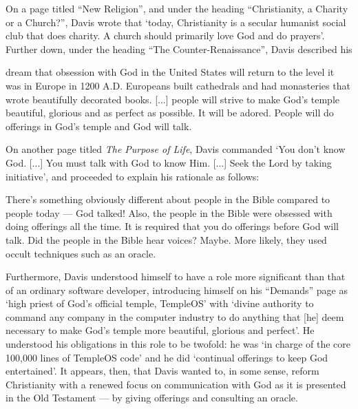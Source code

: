 \documentclass[Draft.tex]{subfiles}
\begin{document}
On a page titled ``New Religion'', and under the heading
``Christianity, a Charity or a Church?'', Davis \parencite*{NewReligion}
wrote that `today, Christianity is a secular humanist social club
that does charity.  A church should primarily love God and do prayers'.
Further down, under the heading ``The Counter-Renaissance'',
Davis described his
\begin{displayquote}
	dream that obsession with God in the United States
	will return to the level it was in Europe in 1200 A.D.
	Europeans built cathedrals and had monasteries
	that wrote beautifully decorated books. [...]
	people will strive to make God's temple beautiful, glorious
	and as perfect as possible.  It will be adored.
	People will do offerings in God's temple and God will talk.
\end{displayquote}
On another page titled \textit{The Purpose of Life},
Davis \parencite*{PurposeLife} commanded `You don't know God. [...]
You must talk with God to know Him. [...] Seek the Lord by taking initiative',
and proceeded to explain his rationale as follows:
\begin{displayquote}
	There's something obviously different about people in the Bible
	compared to people today --- God talked!
	Also, the people in the Bible were obsessed with doing offerings all the time.
	It is required that you do offerings before God will talk.
	Did the people in the Bible hear voices?  Maybe.
	More likely, they used occult techniques such as an oracle.
\end{displayquote}
Furthermore, Davis \parencite*{Demands} understood himself to have a role
more significant than that of an ordinary software developer,
introducing himself on his ``Demands'' page as
`high priest of God's official temple, TempleOS' with
`divine authority to command any company in the computer industry
to do anything that [he] deem necessary to make God's temple
more beautiful, glorious and perfect'.
He understood his obligations in this role to be twofold: he was
`in charge of the core 100,000 lines of TempleOS code'
and he did `continual offerings to keep God entertained'.
It appears, then, that Davis wanted to, in some sense, reform Christianity
with a renewed focus on communication with God
as it is presented in the Old Testament ---
by giving offerings and consulting an oracle.
\end{document}
